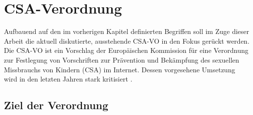 


\chapter{CSA-Verordnung}
\label{ch:CSA}

Aufbauend auf den im vorherigen Kapitel definierten Begriffen soll im Zuge dieser Arbeit die aktuell diskutierte, ausstehende \ac{CSA-VO} in den Fokus gerückt werden.\\
Die \ac{CSA-VO} ist ein Vorschlag der Europäischen Kommission für eine Verordnung \glqq zur Festlegung von Vorschriften zur Prävention und Bekämpfung des sexuellen Missbrauchs von Kindern\grqq{} \cite{steinebach:2023:Medien} (\ac{CSA}) im Internet. Dessen vorgesehene Umsetzung wird in den letzten Jahren stark kritisiert \cite{bundestag:2022, csa_verordnung, steinebach:2023:Medien}.

\section{Ziel der Verordnung}
\label{sec:CSA:Idee}

